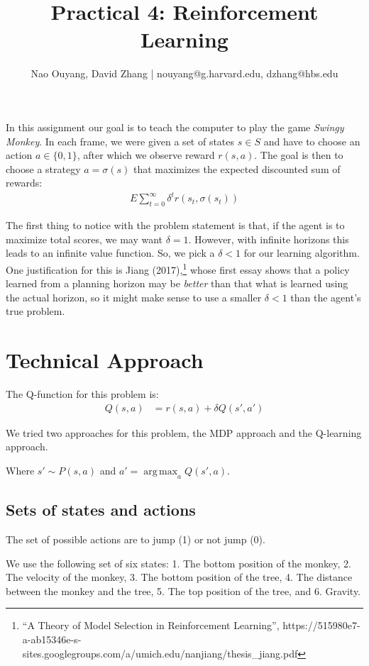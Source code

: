 \documentclass[11pt]{article}
\title{Practical 4: Reinforcement Learning}
\author{Nao Ouyang, David Zhang |  nouyang@g.harvard.edu, dzhang@hbs.edu}
\DeclareMathOperator*{\argmax}{arg\,max}
\begin{document}
\maketitle{}
In this assignment our goal is to teach the computer to play the game \textit{Swingy Monkey}. In each frame, we were given a set of states $s \in S$ and have to choose an action $a \in \{0,1\}$, after which we observe reward $r(s,a)$. The goal is then to choose a strategy $a=\sigma(s)$ that maximizes the expected discounted sum of rewards:
\begin{align}
    E\sum_{t=0}^\infty \delta^t r(s_t,\sigma(s_t))
\end{align}

The first thing to notice with the problem statement is that, if the agent is to maximize total scores, we may want $\delta = 1$. However, with infinite horizons this leads to an infinite value function. So, we pick a $\delta<1$ for our learning algorithm. One justification for this is Jiang (2017),\footnote{``A Theory of Model Selection in Reinforcement Learning'', https://515980e7-a-ab15346e-s-sites.googlegroups.com/a/umich.edu/nanjiang/thesis\_jiang.pdf} whose first essay shows that a policy learned from a planning horizon may be \textit{better} than that what is learned using the actual horizon, so it might make sense to use a smaller $\delta<1$ than the agent's true problem.


\section{Technical Approach}

The Q-function for this problem is:
\begin{align}
    Q(s,a) &= r(s,a) + \delta Q(s', a')
\end{align}

We tried two approaches for this problem, the MDP approach and the Q-learning approach.

Where $s' \sim P(s,a)$ and $a' = \argmax_a Q(s',a)$. 

\subsection{Sets of states and actions}
The set of possible actions are to jump (1) or not jump (0).

We use the following set of six states: 1. The bottom position of the monkey, 2. The velocity of the monkey, 3. The bottom position of the tree, 4. The distance between the monkey and the tree, 5. The top position of the tree, and 6. Gravity.
\end{document}

